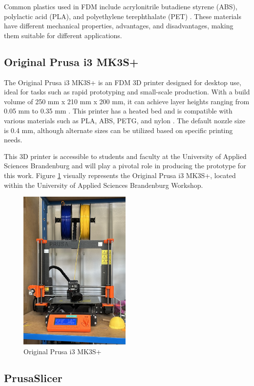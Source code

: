Common plastics used in FDM include acrylonitrile butadiene styrene (ABS), polylactic acid (PLA), and polyethylene terephthalate (PET) \cite{Teamm17}. These materials have different mechanical properties, advantages, and disadvantages, making them suitable for different applications.

\subsection{Original Prusa i3 MK3S+}
\label{subsec:prusa_slicer_mk3s}
The Original Prusa i3 MK3S+ is an FDM 3D printer designed for desktop use, ideal for tasks such as rapid prototyping and small-scale production. With a build volume of 250 mm x 210 mm x 200 mm, it can achieve layer heights ranging from 0.05 mm to 0.35 mm \cite{Prusa}. This printer has a heated bed and is compatible with various materials such as PLA, ABS, PETG, and nylon \cite{Prusa}. The default nozzle size is 0.4 mm, although alternate sizes can be utilized based on specific printing needs.

This 3D printer is accessible to students and faculty at the University of Applied Sciences Brandenburg and will play a pivotal role in producing the prototype for this work. Figure \ref{fig:prusa_slicer_mk3} visually represents the Original Prusa i3 MK3S+, located within the University of Applied Sciences Brandenburg Workshop.

\begin{figure}
  \centering
  \includegraphics[height=8cm]{texs/Part1/chapter1/image/prusa.jpg}
  \caption{Original Prusa i3 MK3S+}
  \label{fig:prusa_slicer_mk3}
\end{figure}

\subsection{PrusaSlicer}
\label{subsec:prusa_slicer}


